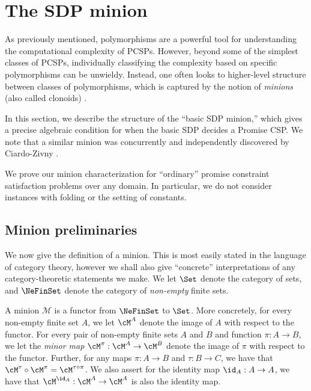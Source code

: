 \section{The SDP minion}
\label{sec:minion}


As previously mentioned, polymorphisms are a powerful tool for understanding the computational complexity of PCSPs. However, beyond some of the simplest classes of PCSPs, individually classifying the complexity based on specific polymorphisms can be unwieldy. Instead, one often looks to higher-level structure between classes of polymorphisms, which is captured by the notion of \emph{minions} (also called clonoids) \cite{BBKO21}.

In this section, we describe the structure of the ``basic SDP minion,'' which gives a precise algebraic condition for when the basic SDP decides a Promise CSP. We note that a similar minion was concurrently and independently discovered by Ciardo-Zivny \cite{cz22-minion}. 

{We prove our minion characterization for ``ordinary'' promise constraint satisfaction problems over any domain. In particular, we do not consider instances with folding or the setting of constants.}

\subsection{Minion preliminaries}






We now give the definition of a minion. {This is most easily stated in the language of category theory, however we shall also give ``concrete'' interpretations of any category-theoretic statements we make. We let $\Set$ denote the category of sets, and $\NeFinSet$ denote the category of \emph{non-empty} finite sets.}

\begin{definition}
A minion $\mathcal M$ is {a functor from $\NeFinSet$ to $\Set$. More concretely, for every non-empty finite set $A$, we let $\cM^A$ denote the image of $A$ with respect to the functor. For every pair of non-empty finite sets $A$ and $B$ and function $\pi : A \to B$, we let the \emph{minor map} $\cM^{\pi} : \cM^{A} \to \cM^{B}$ denote the image of $\pi$ with respect to the functor. Further, for any maps $\pi : A \to B$ and $\tau : B \to C$, we have that $\cM^{\tau} \circ \cM^{\pi} = \cM^{\tau \circ \pi}$. We also assert for the identity map $\id_A : A \to A$, we have that $\cM^{\id_A} : \cM^A \to \cM^A$ is also the identity map.}
\end{definition}

